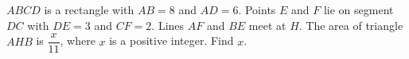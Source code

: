 $ABCD$ is a rectangle with $AB=8$ and $AD=6$. Points $E$ and $F$ lie on segment $DC$ with $DE=3$ and $CF=2$. Lines $AF$ and $BE$ meet at $H$. The area of triangle $AHB$ is $\dfrac{x}{11}$, where $x$ is a positive integer. Find $x$.
